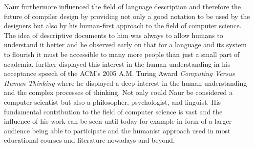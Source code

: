 \documentclass{article}
\begin{document}
Naur furthermore influenced the field of language description and therefore the future of compiler design by providing not only a good notation to be used by the designers but also by his human-first approach to the field of computer science. The idea of descriptive documents to him was always to allow humans to understand it better and he observed early on that for a language and its system to flourish it must be accessible to many more people than just a small part of academia. \cite{naur2007computing} further displayed this interest in the human understanding in his acceptance speech of the ACM's 2005 A.M. Turing Award \textit{Computing Versus Human Thinking} where he displayed a deep interest in the human understanding and the complex processes of thinking. Not only could Naur be considered a computer scientist but also a philosopher, psychologist, and linguist. His fundamental contribution to the field of computer science is vast and the influence of his work can be seen until today for example in form of a larger audience being able to participate and the humanist approach used in most educational courses and literature nowadays and beyond.
\newpage


\end{document}

